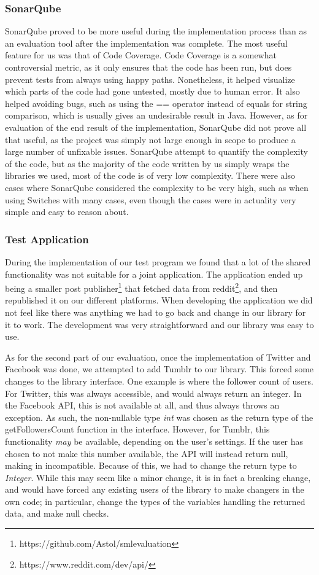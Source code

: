 \documentclass{sigchi-alternate}
\begin{document}
\subsubsection{SonarQube}
SonarQube proved to be more useful during the implementation process than as an evaluation tool after the implementation was complete. The most useful feature for us was that of Code Coverage. Code Coverage is a somewhat controversial
metric, as it only ensures that the code has been run, but does prevent tests from always using happy paths. Nonetheless, it helped visualize which parts of the code had gone untested, mostly due to human error. It also helped avoiding
bugs, such as using the == operator instead of equals for string comparison, which is usually gives an undesirable result in Java. However, as for evaluation of the end result of the implementation, SonarQube did not prove all that useful,
as the project was simply not large enough in scope to produce a large number of unfixable issues. SonarQube attempt to quantify the complexity of the code, but as the majority of the code written by us simply wraps the libraries we used,
most of the code is of very low complexity. There were also cases where SonarQube considered the complexity to be very high, such as when using Switches with many cases, even though the cases were in actuality very simple and easy to reason about.
\subsubsection{Test Application}
During the implementation of our test program we found that a lot of the shared functionality was not suitable for a joint application. The application ended up being a smaller post publisher\footnote{https://github.com/Astol/smlevaluation} that
fetched data from reddit\footnote{https://www.reddit.com/dev/api/}, and then republished it on our different platforms. When developing the application we did not feel like there was anything we had to go back and change in our library for it to
work. The development was very straightforward and our library was easy to use.

As for the second part of our evaluation, once the implementation of Twitter and Facebook was done, we attempted to add Tumblr to our library. This forced some changes to the library interface. One example is where the follower count of users.
For Twitter, this was always accessible, and would always return an integer. In the Facebook API, this is not available at all, and thus always throws an exception. As such, the non-nullable type \textit{int} was chosen as the return type of
the getFollowersCount function in the interface. However, for Tumblr, this functionality \textit{may} be available, depending on the user's settings. If the user has chosen to not make this number available, the API will instead return null, making in
incompatible. Because of this, we had to change the return type to \textit{Integer}. While this may seem like a minor change, it is in fact a breaking change, and would have forced any existing users of the library to make changers in the own code; in
particular, change the types of the variables handling the returned data, and make null checks.
\end{document}
